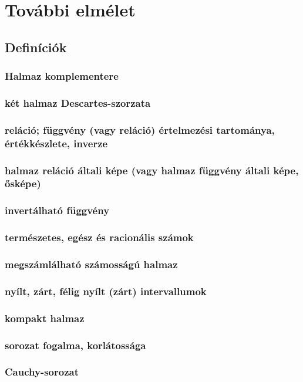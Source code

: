\documentclass[12pt]{article}
\begin{document}
\section{További elmélet}

\subsection{Definíciók}

\subsubsection{Halmaz komplementere}
\subsubsection{két halmaz Descartes-szorzata}
\subsubsection{reláció; függvény (vagy reláció) értelmezési tartománya, értékkészlete, inverze}
\subsubsection{halmaz reláció általi képe (vagy halmaz függvény általi képe, ősképe)}
\subsubsection{invertálható függvény}
\subsubsection{természetes, egész és racionális számok}
\subsubsection{megszámlálható számosságú halmaz}
\subsubsection{nyílt, zárt, félig nyílt (zárt) intervallumok}
\subsubsection{kompakt halmaz}
\subsubsection{sorozat fogalma, korlátossága}
\subsubsection{Cauchy-sorozat}
\end{document}
